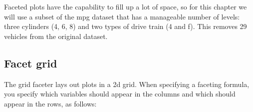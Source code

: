 Faceted plots have the capability to fill up a lot of space, so for this
chapter we will use a subset of the mpg dataset that has a manageable
number of levels: three cylinders (4, 6, 8) and two types of drive train
(4 and f). This removes 29 vehicles from the original dataset.

\begin{Shaded}
\end{Shaded}

\subsection{Facet grid}

The grid faceter lays out plots in a 2d grid. When specifying a faceting
formula, you specify which variables should appear in the columns and
which should appear in the rows, as follows: 

